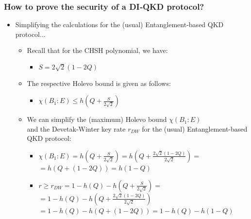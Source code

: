\documentclass{beamer}
\begin{document}
		\begin{frame}
			\frametitle{\large How to prove the security of a DI‑QKD protocol?}

            \vspace{4ex}
            \begin{itemize}
                \item Simplifying the calculations for the (usual) Entanglement-based QKD protocol...
                \begin{itemize}
                    \item Recall that for the CHSH polynomial, we have:
                    \begin{itemize}\footnotesize
                        \item $S = 2 \sqrt{2}(1 - 2Q)$
                    \end{itemize}
                    \vspace{0.5ex}
                    \item The respective Holevo bound is given as follows:
                    \begin{itemize}\footnotesize
                        \item $\chi({B}_{1}:E) \leq h\left( Q + \frac{S}{2 \sqrt{2}} \right)$
                    \end{itemize}
                    \vspace{0.5ex}
                    \item We can simplify the (maximum) Holevo bound $\chi({B}_{1}:E)$\\ and the Devetak-Winter key rate ${r}_{DW}$ for the (usual) Entanglement-based QKD protocol:
                    \begin{itemize}\footnotesize
                        \item $\chi({B}_{1}:E) = h\left( Q + \frac{S}{2 \sqrt{2}} \right) = h\left( Q + \frac{2 \sqrt{2}(1 - 2Q)}{2 \sqrt{2}} \right) = $\\
                        \vspace{0.5ex}
                        \hspace{8ex}
                        $ = h\left( Q + (1 - 2Q) \right) = h\left( 1 - Q \right)$
                        \item $r \geq {r}_{DW} = 1 - h(Q) - h\left( Q + \frac{S}{2 \sqrt{2}} \right) = $\\
                        \vspace{0.25ex}
                        \hspace{6.8ex}$= 1 - h(Q) - h\left( Q + \frac{2 \sqrt{2}(1 - 2Q)}{2 \sqrt{2}} \right)$\\
                        \vspace{0.25ex}
                        \hspace{6.8ex}$= 1 - h(Q) - h\left( Q + (1 - 2Q) \right) = 1 - h(Q) - h(1 - Q)$\\
                    \end{itemize}
                \end{itemize}
            \end{itemize}
            
		\end{frame}
\end{document}
